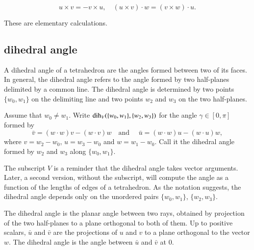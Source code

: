 \begin{lemma}
    $$
    u\times v = -v\times u,\quad
    (u\times v)\cdot w = (v\times w)\cdot u.
    $$
\end{lemma}

\begin{proved}
These are elementary calculations.
\swallowed\end{proved}



\subsection{dihedral angle}

A dihedral angle of a tetrahedron are the angles formed between two of its faces. In general,
the dihedral angle refers to the angle formed by two half-planes
delimited by a common line.  The dihedral angle is determined
by two points $\{w_0,w_1\}$ on the delimiting line
and two points $w_2$ and $w_3$ on the two half-planes.
%
%
%
%
%

\begin{definition}\label{def:dih} Assume that $w_0\ne w_1$.
Write $\operatorname{dih}_V(\{w_0,w_1\},\{w_2,w_3\})$ for the angle $\gamma\in[0,\pi]$
formed
by 
    $$
    \bar v = (w\cdot w) v - (w\cdot v) w\quad\text{and }\quad \bar u =
            (w\cdot w) u - (w\cdot u) w,
    $$
where $v = w_2-w_0$, $u=w_3-w_0$ and $w=w_1-w_0$.  Call it
the dihedral angle formed by $w_2$ and $w_3$ along $\{w_0,w_1\}$.
%
%
\end{definition}
The subscript $V$ is a reminder 
that the dihedral angle takes vector arguments.
Later, a second version, without the subscript, will
compute the angle as a function of the lengths of edges of a 
tetrahedron.
%
%
As the notation suggests, the dihedral angle depends only
on the unordered pairs $\{w_0,w_1\}$, $\{w_2,w_3\}$.

The dihedral angle is the planar angle between two rays, obtained by projection of the two half-planes to a plane orthogonal to both of them.
Up to positive scalars, $\bar u$ and $\bar v$ are the projections of
$u$ and $v$ to a plane orthogonal to the vector $w$.  The
dihedral angle is the angle between $\bar u$ and $\bar v$ at $0$.

